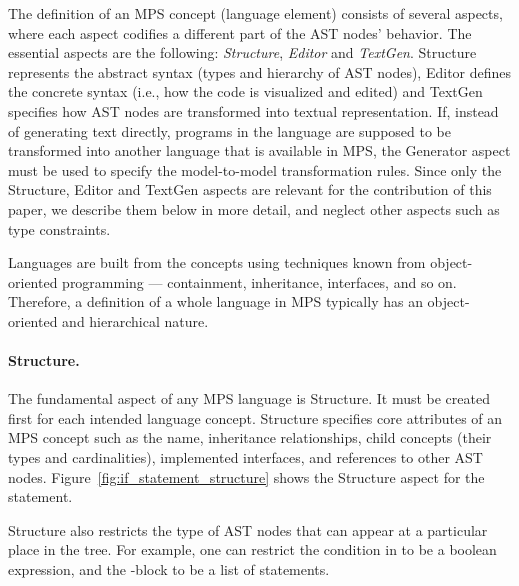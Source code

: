 The definition of an MPS concept (language element) consists of several aspects, where each aspect codifies a different part of the AST nodes' behavior.
The essential aspects are the following: \emph{Structure}, \emph{Editor} and \emph{TextGen}.
Structure represents the abstract syntax (types and hierarchy of AST nodes), Editor defines the concrete syntax (i.e., how the code is visualized and edited) and TextGen specifies how AST nodes are transformed into textual representation.
If, instead of generating text directly, programs in the language are supposed to be transformed into another language that is available in MPS, the Generator aspect must be used to specify the model-to-model transformation rules.
Since only the Structure, Editor and TextGen aspects are relevant for the contribution of this paper, we describe them below in more detail, and neglect other aspects such as type constraints.

Languages are built from the concepts using techniques known from object-oriented programming --- containment, inheritance, interfaces, and so on.
Therefore, a definition of a whole language in MPS typically has an object-oriented and hierarchical nature.

\paragraph{Structure.}
The fundamental aspect of any MPS language is Structure.
It must be created first for each intended language concept.
Structure specifies core attributes of an MPS concept such as the name, inheritance relationships, child concepts (their types and cardinalities), implemented interfaces, and references to other AST nodes.
Figure~\ref{fig:if_statement_structure} shows the Structure aspect for the  statement.

Structure also restricts the type of AST nodes that can appear at a particular place in the tree.
For example, one can restrict the condition in  to be a boolean expression, and the -block to be a list of statements.

